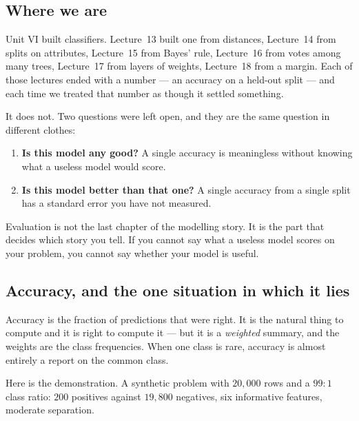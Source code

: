 \documentclass[11pt]{article}
\begin{document}
\subsection{Where we are}

Unit VI built classifiers. Lecture~13 built one from distances, Lecture~14 from
splits on attributes, Lecture~15 from Bayes' rule, Lecture~16 from votes among
many trees, Lecture~17 from layers of weights, Lecture~18 from a margin. Each of
those lectures ended with a number --- an accuracy on a held-out split --- and
each time we treated that number as though it settled something.

It does not. Two questions were left open, and they are the same question in
different clothes:

\begin{enumerate}[leftmargin=*]
  \item \textbf{Is this model any good?} A single accuracy is meaningless
    without knowing what a useless model would score.
  \item \textbf{Is this model better than that one?} A single accuracy from a
    single split has a standard error you have not measured.
\end{enumerate}

\begin{keyidea}
Evaluation is not the last chapter of the modelling story. It is the part that
decides which story you tell. If you cannot say what a useless model scores on
your problem, you cannot say whether your model is useful.
\end{keyidea}

\subsection{Accuracy, and the one situation in which it lies}

Accuracy is the fraction of predictions that were right. It is the natural
thing to compute and it is right to compute it --- but it is a \emph{weighted}
summary, and the weights are the class frequencies. When one class is rare,
accuracy is almost entirely a report on the common class.

Here is the demonstration. A synthetic problem with $20{,}000$ rows and a
$99\!:\!1$ class ratio: $200$ positives against $19{,}800$ negatives, six
informative features, moderate separation.
\end{document}
